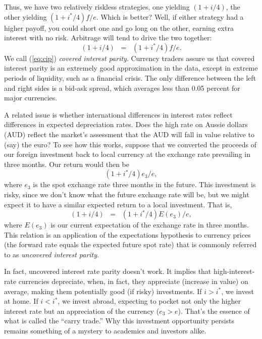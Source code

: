 Thus, we have two relatively riskless  strategies, one yielding
$(1+i/4)$, the other yielding $(1+i^{*}/4)f/e$. Which is better?
Well, if either strategy had a higher payoff, you could short one
and go long on the other, earning extra interest with no risk.
Arbitrage will tend to drive the two together:
\begin{equation}
                            (1+i/4) \;\;=\;\; (1+i^{*}/4)f/e.
                            \label{eq:cip}
\end{equation}
We call (\ref{eq:cip}) {\it covered interest parity\/}.
Currency traders assure us that covered interest parity
is an extremely good approximation in the data, except in extreme periods of liquidity,
such as a financial crisis. The only difference between the left and right sides is a bid-ask spread,
which averages less than 0.05 percent for major currencies.


A related issue is whether international differences
in interest rates reflect differences in expected depreciation rates.
Does the high rate on Aussie dollars (AUD)
reflect the market's assessment that
the AUD will fall in value relative to (say) the euro?
To see how this works, suppose
that we converted the proceeds of our foreign investment
back to local currency at the exchange rate prevailing
in three months.  Our return would then be
\[
                            (1+i^{*}/4) e_{3}/e ,
\]
where $e_3$ is the spot exchange rate three months in the future.
This investment is risky, since we don't know what the
future exchange rate will be, but we might expect
it to have a similar expected return to a local investment.
That is,
\begin{equation}
          (1+i/4) \;\;=\;\; (1+i^{*}/4) E (e_{3})/e ,
          \label{eq:uip}
\end{equation}
where $E(e_3)$ is our current expectation
of the exchange rate in three months.
This relation is an application of the expectations hypothesis to
currency prices (the forward rate equals the expected future spot rate)
that is commonly referred to as {\it uncovered interest parity\/}.


In fact, uncovered interest rate parity doesn't work.
It implies that high-interest-rate currencies depreciate,
when, in fact, they appreciate (increase in value) on average,
making them potentially good (if risky) investments.
If $i>i^*$, we invest at home.  If $i<i^*$, we invest abroad,
expecting to pocket not only the higher interest rate but
an appreciation of the currency ($e_3>e$).
That's the essence of what is called the ``carry trade.''
Why this investment opportunity persists remains something of a mystery to
academics and investors alike.

